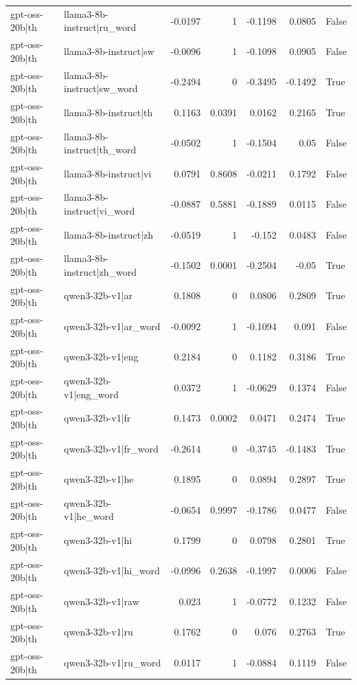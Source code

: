 \begin{table}
\begin{tabular}{l l r r r r l}
gpt-oss-20b|th & llama3-8b-instruct|ru_word & -0.0197 & 1 & -0.1198 & 0.0805 & False \\
gpt-oss-20b|th & llama3-8b-instruct|sw & -0.0096 & 1 & -0.1098 & 0.0905 & False \\
gpt-oss-20b|th & llama3-8b-instruct|sw_word & -0.2494 & 0 & -0.3495 & -0.1492 & True \\
gpt-oss-20b|th & llama3-8b-instruct|th & 0.1163 & 0.0391 & 0.0162 & 0.2165 & True \\
gpt-oss-20b|th & llama3-8b-instruct|th_word & -0.0502 & 1 & -0.1504 & 0.05 & False \\
gpt-oss-20b|th & llama3-8b-instruct|vi & 0.0791 & 0.8608 & -0.0211 & 0.1792 & False \\
gpt-oss-20b|th & llama3-8b-instruct|vi_word & -0.0887 & 0.5881 & -0.1889 & 0.0115 & False \\
gpt-oss-20b|th & llama3-8b-instruct|zh & -0.0519 & 1 & -0.152 & 0.0483 & False \\
gpt-oss-20b|th & llama3-8b-instruct|zh_word & -0.1502 & 0.0001 & -0.2504 & -0.05 & True \\
gpt-oss-20b|th & qwen3-32b-v1|ar & 0.1808 & 0 & 0.0806 & 0.2809 & True \\
gpt-oss-20b|th & qwen3-32b-v1|ar_word & -0.0092 & 1 & -0.1094 & 0.091 & False \\
gpt-oss-20b|th & qwen3-32b-v1|eng & 0.2184 & 0 & 0.1182 & 0.3186 & True \\
gpt-oss-20b|th & qwen3-32b-v1|eng_word & 0.0372 & 1 & -0.0629 & 0.1374 & False \\
gpt-oss-20b|th & qwen3-32b-v1|fr & 0.1473 & 0.0002 & 0.0471 & 0.2474 & True \\
gpt-oss-20b|th & qwen3-32b-v1|fr_word & -0.2614 & 0 & -0.3745 & -0.1483 & True \\
gpt-oss-20b|th & qwen3-32b-v1|he & 0.1895 & 0 & 0.0894 & 0.2897 & True \\
gpt-oss-20b|th & qwen3-32b-v1|he_word & -0.0654 & 0.9997 & -0.1786 & 0.0477 & False \\
gpt-oss-20b|th & qwen3-32b-v1|hi & 0.1799 & 0 & 0.0798 & 0.2801 & True \\
gpt-oss-20b|th & qwen3-32b-v1|hi_word & -0.0996 & 0.2638 & -0.1997 & 0.0006 & False \\
gpt-oss-20b|th & qwen3-32b-v1|raw & 0.023 & 1 & -0.0772 & 0.1232 & False \\
gpt-oss-20b|th & qwen3-32b-v1|ru & 0.1762 & 0 & 0.076 & 0.2763 & True \\
gpt-oss-20b|th & qwen3-32b-v1|ru_word & 0.0117 & 1 & -0.0884 & 0.1119 & False \\

\end{tabular}
\end{table}
